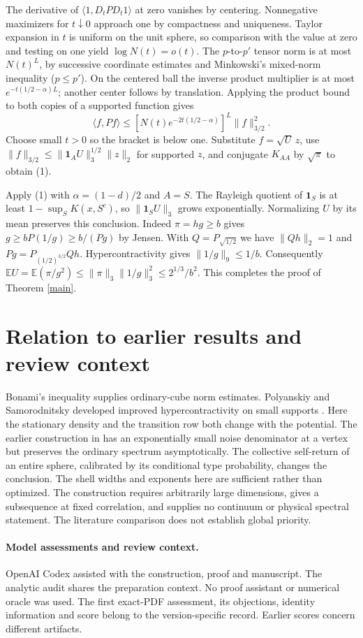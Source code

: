 \documentclass[11pt]{article}
\newcommand{\E}{\mathbb E}
\newcommand{\one}{\mathbf 1}
\newcommand{\ip}[2]{\langle #1,#2\rangle}
\begin{document}
The derivative of $\ip{1}{D_t P D_t1}$ at zero vanishes by centering. Nonnegative maximizers for $t\downarrow0$ approach one by compactness and uniqueness. Taylor expansion in $t$ is uniform on the unit sphere, so comparison with the value at zero and testing on one yield $\log N(t)=o(t)$. The $p$-to-$p'$ tensor norm is at most $N(t)^L$, by successive coordinate estimates and Minkowski's mixed-norm inequality ($p\le p'$). On the centered ball the inverse product multiplier is at most $e^{-t(1/2-\alpha)L}$; another center follows by translation. Applying the product bound to both copies of a supported function gives
\[
 \ip{f}{P f}\le[N(t)e^{-2t(1/2-\alpha)}]^L\|f\|_{3/2}^2 .
\]
Choose small $t>0$ so the bracket is below one. Substitute $f=\sqrt U\,z$, use $\|f\|_{3/2}\le\|\one_A U\|_3^{1/2}\|z\|_2$ for supported $z$, and conjugate $K_{AA}$ by $\sqrt{\pi}$ to obtain (1).

Apply (1) with $\alpha=(1-d)/2$ and $A=S$. The Rayleigh quotient of $\one_S$ is at least $1-\sup_S K(x,S^c)$, so $\|\one_S U\|_3$ grows exponentially. Normalizing $U$ by its mean preserves this conclusion. Indeed $\pi=hg\ge b$ gives $g\ge b P(1/g)\ge b/(Pg)$ by Jensen. With $Q=P_{\sqrt{1/2}}$ we have $\|Qh\|_2=1$ and $Pg=P_{(1/2)^{3/2}}Qh$. Hypercontractivity gives $\|1/g\|_9\le1/b$. Consequently $\E U=\E(\pi/g^2)\le\|\pi\|_3\|1/g\|_3^2\le 2^{1/3}/b^2$. This completes the proof of Theorem \ref{main}.

\section{Relation to earlier results and review context}
Bonami's inequality supplies ordinary-cube norm estimates. Polyanskiy and Samorodnitsky developed improved hypercontractivity on small supports \cite{ps}. Here the stationary density and the transition row both change with the potential. The earlier construction in \cite[Section 11]{mom} has an exponentially small noise denominator at a vertex but preserves the ordinary spectrum asymptotically. The collective self-return of an entire sphere, calibrated by its conditional type probability, changes the conclusion. The shell widths and exponents here are sufficient rather than optimized. The construction requires arbitrarily large dimensions, gives a subsequence at fixed correlation, and supplies no continuum or physical spectral statement. The literature comparison does not establish global priority.

\paragraph{Model assessments and review context.} OpenAI Codex assisted with the construction, proof and manuscript. The analytic audit shares the preparation context. No proof assistant or numerical oracle was used. The first exact-PDF assessment, its objections, identity information and score belong to the version-specific record. Earlier scores concern different artifacts.
\end{document}
